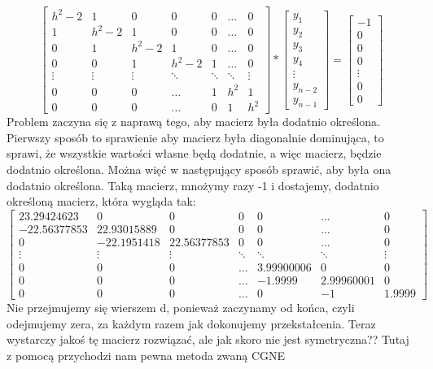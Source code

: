 \documentclass[12pt]{article}
\begin{document}
\[
\begin{bmatrix}
    h^{2}-2 & 1 & 0 & 0 & 0 & \dots & 0\\
    1 & h^{2}-2 & 1 & 0 & 0 & \dots & 0\\ 
    0 & 1 & h^{2}-2 & 1 & 0 & \dots & 0\\
    0 & 0 & 1 & h^{2}-2 & 1 &\dots & 0\\
    \vdots & \vdots & \vdots & \ddots & \ddots & \ddots & \vdots\\
    0 & 0 & 0 & \hdots & 1 & h^{2} & 1\\
    0 & 0 & 0 & \hdots & 0 & 1 & h^{2}
\end{bmatrix}
*
\begin{bmatrix}
    y_{1}\\
    y_{2}\\
    y_{3}\\
    y_{4}\\
    \vdots\\
    y_{n-2}\\
    y_{n-1}
\end{bmatrix}
=
\begin{bmatrix}
    -1\\
    0\\
    0\\
    0\\
    \vdots\\
    0\\
    0
\end{bmatrix}
\]
Problem zaczyna się z naprawą tego, aby macierz była dodatnio określona. Pierwszy sposób to sprawienie aby macierz była diagonalnie dominująca, to sprawi, że wszystkie wartości własne będą dodatnie, a więc macierz, będzie dodatnio określona. Można więć w następujący sposób sprawić, aby była ona dodatnio określona. Taką macierz, mnożymy razy -1 i dostajemy, dodatnio określoną macierz, która wygląda tak: 
\[
\begin{bmatrix}
    23.29424623 & 0 & 0 & 0 & 0 & \dots & 0\\
    -22.56377853 & 22.93015889 & 0 & 0 & 0 & \dots & 0\\ 
    0 & -22.1951418 & 22.56377853 & 0 & 0 & \dots & 0\\
    \vdots & \vdots & \vdots & \ddots & \ddots & \ddots & \vdots\\
    0 & 0 & 0 & \hdots & 3.99900006 & 0 & 0\\
    0 & 0 & 0 & \hdots & -1.9999 & 2.99960001 & 0\\
    0 & 0 & 0 & \hdots & 0 & -1 & 1.9999
\end{bmatrix}
\]
Nie przejmujemy się wierszem d, ponieważ zaczynamy od końca, czyli odejmujemy zera, za każdym razem jak dokonujemy przekstałcenia. Teraz wystarczy jakoś tę macierz rozwiązać, ale jak skoro nie jest symetryczna?? Tutaj z pomocą przychodzi nam pewna metoda zwaną CGNE
\end{document}
